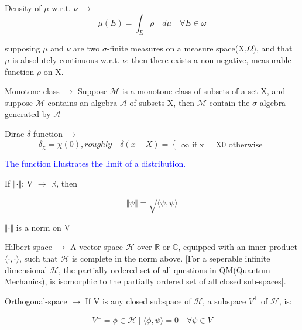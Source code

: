 \documentclass[a4paper, 10pt, onepage]{elegantbook}
\begin{document}
{Density of $\mu$ w.r.t. $\nu$ $\longrightarrow$
\begin{equation}
\mu(E) = \int_E \rho \quad d\mu \quad \forall E \in \omega
\end{equation}

supposing $\mu$ and $\nu$ are two $\sigma$-finite measures on a measure space(X,$\Omega$),
and that $\mu$ is absolutely continuous w.r.t. $\nu$: then there exists a non-negative, measurable function $\rho$ on X. 
 
Monotone-class $\longrightarrow$ Suppose $\mathscr M$ is a monotone class of subsets of a set X, 
and suppose $\mathscr M$ contains an
algebra $\mathscr A$ of subsets X, then $\mathscr M$ contain the $\sigma$-algebra generated by $\mathscr A$ 
 
Dirac $\delta$ function $\longrightarrow$
\begin{equation} \label{eq:Dirac Delta Function}
\delta_\chi = \chi(0),
    roughly \quad \delta(x - X) = \left\{
    \begin{array}{ll}
    \infty \text{ if x = X} 
    0      \text{ otherwise} 
    \end{array} 
    \right.
\end{equation}
 
\textcolor{blue}{The function illustrates the limit of a distribution.}  

If $\Vert \cdot \Vert$: V $\longrightarrow$ $\mathbb R$, then

\begin{equation}
\Vert \psi \Vert = \sqrt{\langle \psi,\psi \rangle}
\end{equation}

$\Vert \cdot \Vert$ is a norm on V  

Hilbert-space $\longrightarrow$ A vector space $\mathscr H$ over $\mathbb R$ or $\mathbb C$, 
equipped with an inner product $\langle \cdot, \cdot \rangle$,
 such that $\mathscr H$ is complete in the norm above.
 [For a seperable infinite dimensional $\mathscr H$, the partially ordered set of all questions in QM(Quantum 
Mechanics), is isomorphic
 to the partially ordered set of all closed sub-spaces].  

Orthogonal-space $\longrightarrow$ If V is any closed subspace of $\mathscr H$, a subspace 
$V^\perp$ of $\mathscr H$, is:  

\begin{equation}
V^\perp = {\phi \in \mathscr H \mid \langle \phi, \psi \rangle = 0 \quad \forall \psi \in V}
\end{equation}

}
\end{document}
